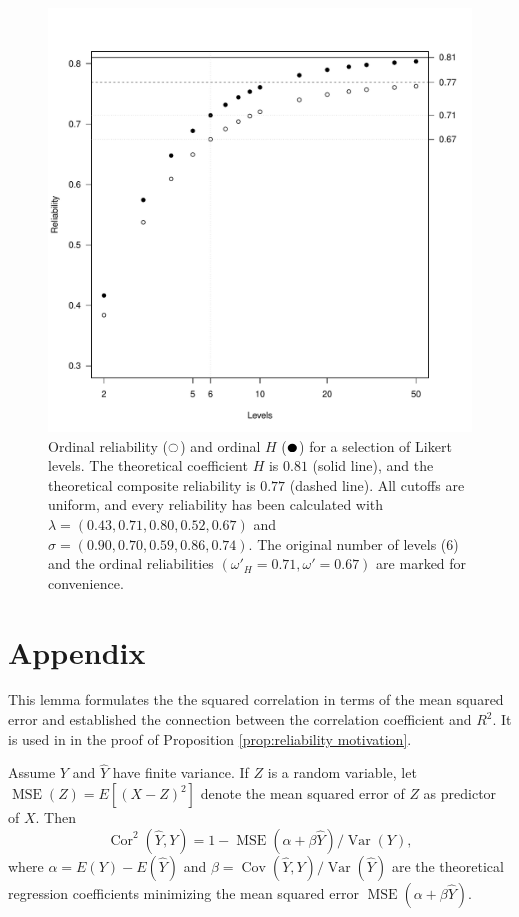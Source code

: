 \documentclass[twoside]{article}
\DeclareMathOperator{\Var}{Var}
\DeclareMathOperator{\Cor}{Cor}
\DeclareMathOperator{\Cov}{Cov}
\DeclareMathOperator{\MSE}{MSE}
\begin{document}
\begin{figure}
\noindent \begin{centering}
\includegraphics[scale=0.5]{chunks/ordinals}
\par\end{centering}
\caption{\label{fig:Ordinal reliability}Ordinal reliability ($\fullmoon$)
and ordinal $H$ ($\newmoon$) for a selection of Likert levels. The
theoretical coefficient $H$ is $0.81$ (solid line), and the theoretical
composite reliability is $0.77$ (dashed line). All cutoffs are uniform,
and every reliability has been calculated with $\lambda=(0.43,0.71,0.80,0.52,0.67)$
and $\sigma=(0.90,0.70,0.59,0.86,0.74)$. The original number of levels
($6$) and the ordinal reliabilities $(\omega'_{H}=0.71,\omega'=0.67)$
are marked for convenience.}
\end{figure}

\clearpage
\section*{Appendix}

This lemma formulates the the squared correlation in terms of the mean squared error and established the connection between the correlation coefficient and $R^2$. It is used in in the proof of Proposition \ref{prop:reliability motivation}. 
\begin{lem}
\label{lem:r^2 and correlation}Assume $Y$ and $\hat{Y}$ have finite
variance. If $Z$ is a random variable, let $\MSE(Z) = E[(X-Z)^2]$ denote the mean squared error of $Z$ as predictor of $X$. Then 
\begin{equation}
\Cor^{2}(\hat{Y},Y)=1-\MSE(\alpha+\beta\hat{Y})/\Var(Y),\label{eq:rsq and correlation}
\end{equation}
where $\alpha=E(Y)-E(\hat{Y})$ and $\beta=\Cov(\hat{Y},Y)/\Var(\hat{Y})$ are the theoretical regression coefficients minimizing the mean squared error $\MSE(\alpha+\beta\hat{Y})$. 
\end{lem}
\end{document}
